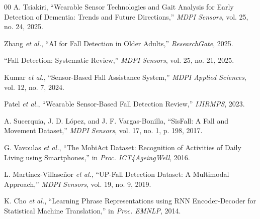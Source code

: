 \documentclass[conference]{IEEEtran}
\begin{document}
\begin{thebibliography}{00}
A. Tsiakiri, ``Wearable Sensor Technologies and Gait Analysis for Early Detection of Dementia: Trends and Future Directions,'' \textit{MDPI Sensors}, vol. 25, no. 24, 2025.

Zhang \textit{et al.}, ``AI for Fall Detection in Older Adults,'' \textit{ResearchGate}, 2025.

``Fall Detection: Systematic Review,'' \textit{MDPI Sensors}, vol. 25, no. 21, 2025.

Kumar \textit{et al.}, ``Sensor-Based Fall Assistance System,'' \textit{MDPI Applied Sciences}, vol. 12, no. 7, 2024.

Patel \textit{et al.}, ``Wearable Sensor-Based Fall Detection Review,'' \textit{IJIRMPS}, 2023.

A. Sucerquia, J. D. L\'{o}pez, and J. F. Vargas-Bonilla, ``SisFall: A Fall and Movement Dataset,'' \textit{MDPI Sensors}, vol. 17, no. 1, p. 198, 2017.

G. Vavoulas \textit{et al.}, ``The MobiAct Dataset: Recognition of Activities of Daily Living using Smartphones,'' in \textit{Proc. ICT4AgeingWell}, 2016.

L. Mart\'{i}nez-Villase\~{n}or \textit{et al.}, ``UP-Fall Detection Dataset: A Multimodal Approach,'' \textit{MDPI Sensors}, vol. 19, no. 9, 2019.

K. Cho \textit{et al.}, ``Learning Phrase Representations using RNN Encoder-Decoder for Statistical Machine Translation,'' in \textit{Proc. EMNLP}, 2014.

\end{thebibliography}
\end{document}
